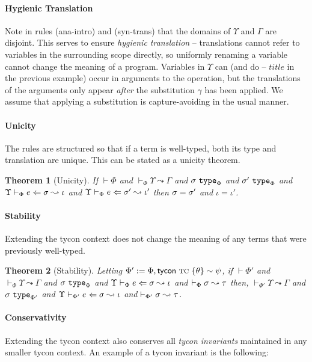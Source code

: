 \documentclass[10pt,preprint]{sigplanconf}
\newtheorem{theorem}{Theorem}
\begin{document}
\paragraph{Hygienic Translation} 
Note in rules (ana-intro) and (syn-trans) that the domains of $\Upsilon$ and $\Gamma$ are disjoint. This serves to ensure \emph{hygienic translation} -- translations cannot refer to variables in the surrounding scope directly, so uniformly renaming a variable cannot change the meaning of a program. Variables in $\Upsilon$ can (and do -- $title$ in the previous example) occur in arguments to the operation, but the translations of the arguments only appear \emph{after} the substitution $\gamma$ has been applied. We assume that applying a substitution is capture-avoiding in the usual manner. %

\paragraph{Unicity}
The rules are structured so that if a term is well-typed, both its type and translation are unique. This can be stated as a unicity theorem.
\begin{theorem}[Unicity]
If $\vdash \Phi$ and $\vdash_\Phi \Upsilon \leadsto \Gamma$ and $\sigma~\texttt{type}_{\Phi}$ and $\sigma'~\texttt{type}_{\Phi}$ and $\Upsilon \vdash_{\Phi} e \Leftarrow \sigma \leadsto \iota$ and $\Upsilon \vdash_{\Phi} e \Leftarrow \sigma' \leadsto \iota'$ then $\sigma = \sigma'$ and $\iota = \iota'$.
\end{theorem}

\paragraph{Stability}
Extending the tycon context does not change the meaning of any terms that were previously well-typed.
\begin{theorem}[Stability]
Letting $\Phi' := \Phi, {\sf tycon}~\textsc{tc} ~\{\theta\} \sim \psi$, if $\vdash \Phi'$ and $\vdash_\Phi \Upsilon \leadsto \Gamma$ and $\sigma~\texttt{type}_{\Phi}$ and $\Upsilon \vdash_{\Phi} e \Leftarrow \sigma \leadsto \iota$ and $\vdash_\Phi \sigma \leadsto \tau$ then, $\vdash_{\Phi'} \Upsilon \leadsto \Gamma$ and $\sigma~\texttt{type}_{\Phi'}$ and $\Upsilon \vdash_{\Phi'} e \Leftarrow \sigma \leadsto \iota$ and $\vdash_{\Phi'} \sigma \leadsto \tau$.
\end{theorem}

\paragraph{Conservativity} 
Extending the tycon context also conserves all \emph{tycon invariants} maintained in any smaller tycon context. An example of a tycon invariant is the following:
\end{document}
